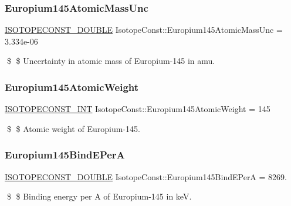 \subsubsection{\texorpdfstring{Europium145\+Atomic\+Mass\+Unc}{Europium145AtomicMassUnc}}
{\footnotesize\ttfamily \mbox{\hyperlink{group___isotope_const-_macros_ga8f45a7272ce02c0b4c65c44636ed719a}{I\+S\+O\+T\+O\+P\+E\+C\+O\+N\+S\+T\+\_\+\+D\+O\+U\+B\+LE}} Isotope\+Const\+::\+Europium145\+Atomic\+Mass\+Unc = 3.\+334e-\/06}

\$ \$ Uncertainty in atomic mass of Europium-\/145 in amu. \mbox{\label{group___isotope_const-_europium-_eu145_gac7b1773ebe104b022d7710cfeccdb004}} 
\subsubsection{\texorpdfstring{Europium145\+Atomic\+Weight}{Europium145AtomicWeight}}
{\footnotesize\ttfamily \mbox{\hyperlink{group___isotope_const-_macros_ga5f18360b3e99483a35c32d789e62621c}{I\+S\+O\+T\+O\+P\+E\+C\+O\+N\+S\+T\+\_\+\+I\+NT}} Isotope\+Const\+::\+Europium145\+Atomic\+Weight = 145}

\$ \$ Atomic weight of Europium-\/145. \mbox{\label{group___isotope_const-_europium-_eu145_gad47df945f6d66153e239ec3f6742a3d4}} 
\subsubsection{\texorpdfstring{Europium145\+Bind\+E\+PerA}{Europium145BindEPerA}}
{\footnotesize\ttfamily \mbox{\hyperlink{group___isotope_const-_macros_ga8f45a7272ce02c0b4c65c44636ed719a}{I\+S\+O\+T\+O\+P\+E\+C\+O\+N\+S\+T\+\_\+\+D\+O\+U\+B\+LE}} Isotope\+Const\+::\+Europium145\+Bind\+E\+PerA = 8269.}

\$ \$ Binding energy per A of Europium-\/145 in keV. \mbox{\label{group___isotope_const-_europium-_eu145_ga7bc33f053c63286057e535045cc2db25}} 
